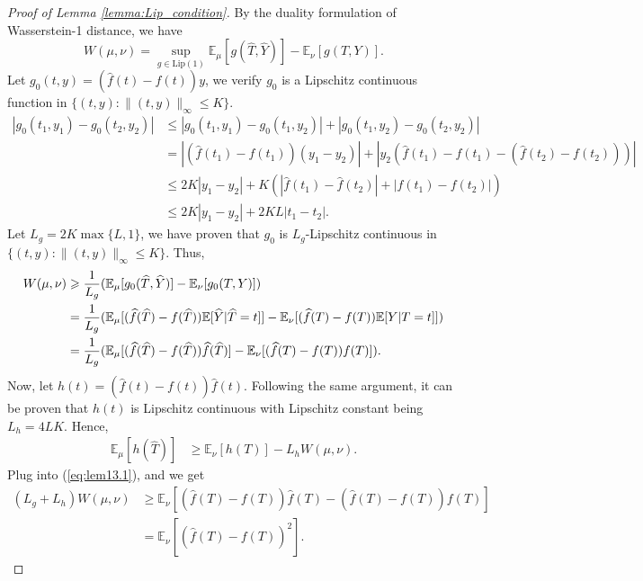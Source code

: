 \begin{proof}[Proof of Lemma \ref{lemma:Lip_condition}]
    By the duality formulation of Wasserstein-1 distance, we have 
\begin{equation*}
W( \mu ,\nu ) =\sup _{g\in \text{Lip}( 1)}\mathbb{E}_{\mu }[ g(\hat{T} ,\hat{Y})] -\mathbb{E}_{\nu }[ g( T,Y)] .
\end{equation*}
Let $ g_{0}( t,y) =(\hat{f}( t) -f( t)) y$, we verify $ g_{0}$ is a Lipschitz continuous function in $\{(t,y):\|(t,y)\|_\infty \leqslant K\}$.
\begin{align*}
|g_{0}( t_{1} ,y_{1}) -g_{0}( t_{2} ,y_{2}) | & \leqslant |g_{0}( t_{1} ,y_{1}) -g_{0}( t_{1} ,y_{2}) |+|g_{0}( t_{1} ,y_{2}) -g_{0}( t_{2} ,y_{2}) |\\
 & =|(\hat{f}( t_{1}) -f( t_{1}))( y_{1} -y_{2}) |+|y_{2}(\hat{f}( t_{1}) -f( t_{1}) -(\hat{f}( t_{2}) -f( t_{2}))) |\\
 & \leqslant 2K|y_{1} -y_{2} |+K( |\hat{f}( t_{1}) -\hat{f}( t_{2}) |+|f( t_{1}) -f( t_{2}) |)\\
 & \leqslant 2K|y_{1} -y_{2} |+2KL|t_{1} -t_{2} |.
\end{align*}Let $ L_{g} =2K\max\{L,1\}$, we have proven that $ g_{0}$ is $ L_{g}$-Lipschitz continuous in $\{(t,y):\|(t,y)\|_\infty \leqslant K\}$. Thus, 
\begin{align}
W( \mu ,\nu ) & \geqslant \frac{1}{L_{g}}(\mathbb{E}_{\mu }[ g_{0}(\hat{T} ,\hat{Y})] -\mathbb{E}_{\nu }[ g_{0}( T,Y)])  \notag\\
 & =\frac{1}{L_{g}}(\mathbb{E}_{\mu }[(\hat{f}(\hat{T}) -f(\hat{T}))\mathbb{E}[\hat{Y} |\hat{T} =t]] -\mathbb{E}_{\nu }[(\hat{f}( T) -f( T))\mathbb{E}[ Y|T=t]])\notag\\
 & =\frac{1}{L_{g}}(\mathbb{E}_{\mu }[(\hat{f}(\hat{T}) -f(\hat{T}))\hat{f}(\hat{T})] -\mathbb{E}_{\nu }[(\hat{f}( T) -f( T)) f( T)]) .\label{eq:lem13.1}
\end{align}
Now, let $ h( t) =(\hat{f}( t) -f( t))\hat{f}( t)$. Following the same argument, it can be proven that $ h( t)$ is Lipschitz continuous with Lipschitz constant being $ L_{h} =4LK$. Hence,
\begin{align*}
\mathbb{E}_{\mu }[ h(\hat{T})] & \geqslant \mathbb{E}_{\nu }[ h( T)] -L_{h} W( \mu ,\nu ) .
\end{align*}Plug into (\ref{eq:lem13.1}), and we get 
\begin{align*}
( L_{g} +L_{h}) W( \mu ,\nu ) & \geqslant \mathbb{E}_{\nu }[(\hat{f}( T) -f( T))\hat{f}( T) -(\hat{f}( T) -f( T)) f( T)]\\
 & =\mathbb{E}_{\nu }\left[(\hat{f}( T) -f( T))^{2}\right] .
\end{align*}
\end{proof}
